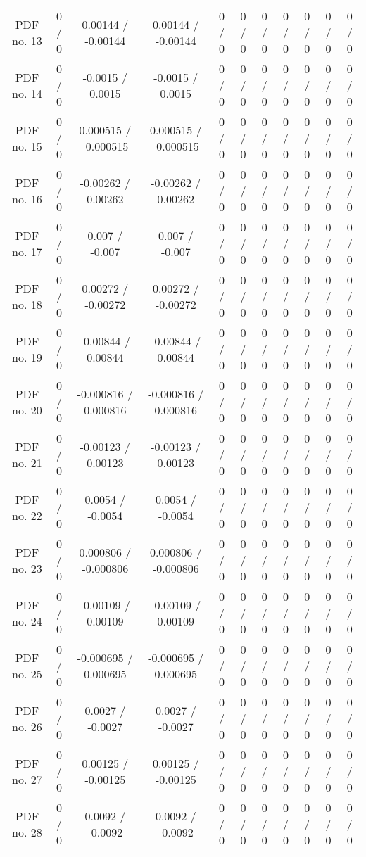 \begin{table}[htbp]
\begin{center}
\begin{tabular}{|c|c|c|c|c|c|c|c|c|c|c|}
  PDF no. 13 & 0 / 0 & 0.00144 / -0.00144 & 0.00144 / -0.00144 & 0 / 0 & 0 / 0 & 0 / 0 & 0 / 0 & 0 / 0 & 0 / 0 & 0 / 0 \\ 
  PDF no. 14 & 0 / 0 & -0.0015 / 0.0015 & -0.0015 / 0.0015 & 0 / 0 & 0 / 0 & 0 / 0 & 0 / 0 & 0 / 0 & 0 / 0 & 0 / 0 \\ 
  PDF no. 15 & 0 / 0 & 0.000515 / -0.000515 & 0.000515 / -0.000515 & 0 / 0 & 0 / 0 & 0 / 0 & 0 / 0 & 0 / 0 & 0 / 0 & 0 / 0 \\ 
  PDF no. 16 & 0 / 0 & -0.00262 / 0.00262 & -0.00262 / 0.00262 & 0 / 0 & 0 / 0 & 0 / 0 & 0 / 0 & 0 / 0 & 0 / 0 & 0 / 0 \\ 
  PDF no. 17 & 0 / 0 & 0.007 / -0.007 & 0.007 / -0.007 & 0 / 0 & 0 / 0 & 0 / 0 & 0 / 0 & 0 / 0 & 0 / 0 & 0 / 0 \\ 
  PDF no. 18 & 0 / 0 & 0.00272 / -0.00272 & 0.00272 / -0.00272 & 0 / 0 & 0 / 0 & 0 / 0 & 0 / 0 & 0 / 0 & 0 / 0 & 0 / 0 \\ 
  PDF no. 19 & 0 / 0 & -0.00844 / 0.00844 & -0.00844 / 0.00844 & 0 / 0 & 0 / 0 & 0 / 0 & 0 / 0 & 0 / 0 & 0 / 0 & 0 / 0 \\ 
  PDF no. 20 & 0 / 0 & -0.000816 / 0.000816 & -0.000816 / 0.000816 & 0 / 0 & 0 / 0 & 0 / 0 & 0 / 0 & 0 / 0 & 0 / 0 & 0 / 0 \\ 
  PDF no. 21 & 0 / 0 & -0.00123 / 0.00123 & -0.00123 / 0.00123 & 0 / 0 & 0 / 0 & 0 / 0 & 0 / 0 & 0 / 0 & 0 / 0 & 0 / 0 \\ 
  PDF no. 22 & 0 / 0 & 0.0054 / -0.0054 & 0.0054 / -0.0054 & 0 / 0 & 0 / 0 & 0 / 0 & 0 / 0 & 0 / 0 & 0 / 0 & 0 / 0 \\ 
  PDF no. 23 & 0 / 0 & 0.000806 / -0.000806 & 0.000806 / -0.000806 & 0 / 0 & 0 / 0 & 0 / 0 & 0 / 0 & 0 / 0 & 0 / 0 & 0 / 0 \\ 
  PDF no. 24 & 0 / 0 & -0.00109 / 0.00109 & -0.00109 / 0.00109 & 0 / 0 & 0 / 0 & 0 / 0 & 0 / 0 & 0 / 0 & 0 / 0 & 0 / 0 \\ 
  PDF no. 25 & 0 / 0 & -0.000695 / 0.000695 & -0.000695 / 0.000695 & 0 / 0 & 0 / 0 & 0 / 0 & 0 / 0 & 0 / 0 & 0 / 0 & 0 / 0 \\ 
  PDF no. 26 & 0 / 0 & 0.0027 / -0.0027 & 0.0027 / -0.0027 & 0 / 0 & 0 / 0 & 0 / 0 & 0 / 0 & 0 / 0 & 0 / 0 & 0 / 0 \\ 
  PDF no. 27 & 0 / 0 & 0.00125 / -0.00125 & 0.00125 / -0.00125 & 0 / 0 & 0 / 0 & 0 / 0 & 0 / 0 & 0 / 0 & 0 / 0 & 0 / 0 \\ 
  PDF no. 28 & 0 / 0 & 0.0092 / -0.0092 & 0.0092 / -0.0092 & 0 / 0 & 0 / 0 & 0 / 0 & 0 / 0 & 0 / 0 & 0 / 0 & 0 / 0 \\ 

\end{tabular}
\end{center}
\end{table}
